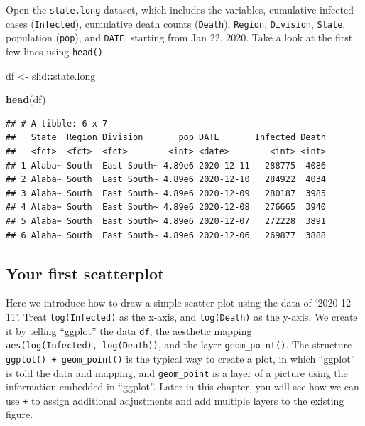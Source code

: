 \documentclass[]{book}
\newenvironment{Shaded}{\begin{snugshade}}{\end{snugshade}}
\newcommand{\KeywordTok}[1]{\textcolor[rgb]{0.13,0.29,0.53}{\textbf{#1}}}
\newcommand{\StringTok}[1]{\textcolor[rgb]{0.31,0.60,0.02}{#1}}
\newcommand{\OperatorTok}[1]{\textcolor[rgb]{0.81,0.36,0.00}{\textbf{#1}}}
\newcommand{\NormalTok}[1]{#1}
\begin{document}
Open the \texttt{state.long} dataset, which includes the variables,
cumulative infected cases (\texttt{Infected}), cumulative death counts
(\texttt{Death}), \texttt{Region}, \texttt{Division}, \texttt{State},
population (\texttt{pop}), and \texttt{DATE}, starting from Jan 22,
2020. Take a look at the first few lines using \texttt{head()}.

\begin{Shaded}
\begin{Highlighting}[]
\NormalTok{df <-}\StringTok{ }\NormalTok{slid}\OperatorTok{::}\NormalTok{state.long}

\KeywordTok{head}\NormalTok{(df)}
\end{Highlighting}
\end{Shaded}

\begin{verbatim}
## # A tibble: 6 x 7
##   State  Region Division       pop DATE       Infected Death
##   <fct>  <fct>  <fct>        <int> <date>        <int> <int>
## 1 Alaba~ South  East South~ 4.89e6 2020-12-11   288775  4086
## 2 Alaba~ South  East South~ 4.89e6 2020-12-10   284922  4034
## 3 Alaba~ South  East South~ 4.89e6 2020-12-09   280187  3985
## 4 Alaba~ South  East South~ 4.89e6 2020-12-08   276665  3940
## 5 Alaba~ South  East South~ 4.89e6 2020-12-07   272228  3891
## 6 Alaba~ South  East South~ 4.89e6 2020-12-06   269877  3888
\end{verbatim}

\subsection{Your first scatterplot}\label{your-first-scatterplot}

Here we introduce how to draw a simple scatter plot using the data of
`2020-12-11'. Treat \texttt{log(Infected)} as the x-axis, and
\texttt{log(Death)} as the y-axis. We create it by telling ``ggplot''
the data \texttt{df}, the aesthetic mapping
\texttt{aes(log(Infected),\ log(Death))}, and the layer
\texttt{geom\_point()}. The structure
\texttt{ggplot()\ +\ geom\_point()} is the typical way to create a plot,
in which ``ggplot'' is told the data and mapping, and
\texttt{geom\_point} is a layer of a picture using the information
embedded in ``ggplot''. Later in this chapter, you will see how we can
use \texttt{+} to assign additional adjustments and add multiple layers
to the existing figure.
\end{document}
